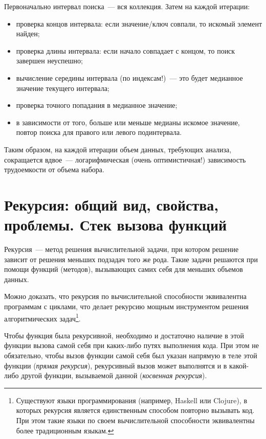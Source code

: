 Первоначально интервал поиска~--- вся коллекция.
Затем на каждой итерации:
\begin{itemize}
  \item проверка концов интервала: если значение/ключ совпали, то
        искомый элемент найден;
  \item проверка длины интервала: если начало совпадает с концом, то
        поиск завершен неуспешно;
  \item вычисление середины интервала (по индексам!)~--- это будет
        медианное значение текущего интервала;
  \item проверка точного попадания в медианное значение;
  \item в зависимости от того, больше или меньше медианы искомое
        значение, повтор поиска для правого или левого подинтервала.
\end{itemize}

Таким образом, на каждой итерации объем данных, требующих анализа, сокращается вдвое~---
логарифмическая (очень оптимистичная!) зависимость трудоемкости от объема набора.

%
%

\section{Рекурсия: общий вид, свойства, проблемы. Стек вызова функций}
Рекурсия~--- метод решения вычислительной задачи, при котором решение зависит от решения меньших подзадач того же рода. Такие задачи решаются
при помощи функций (методов), вызывающих самих себя для меньших объемов данных.

Можно доказать, что рекурсия по вычислительной способности эквивалентна программам с циклами, что делает
рекурсию мощным инструментом решения алгоритмических задач\footnote{Существуют языки программирования (например, Haskell или Clojure),
  в которых рекурсия является единственным способом повторно вызывать код. При этом такие языки по своем вычислительной
  способности эквивалентны более традиционным языкам.}.

Чтобы функция была рекурсивной, необходимо и достаточно наличие в этой функции вызова самой себя при каких-либо путях выполнения кода. При этом
не обязательно, чтобы вызов функции самой себя был указан напрямую в теле этой функции (\textit{прямая рекурсия}), рекурсивный вызов может
выполнятся и в какой-либо другой функции, вызываемой данной (\textit{косвенная рекурсия}).

